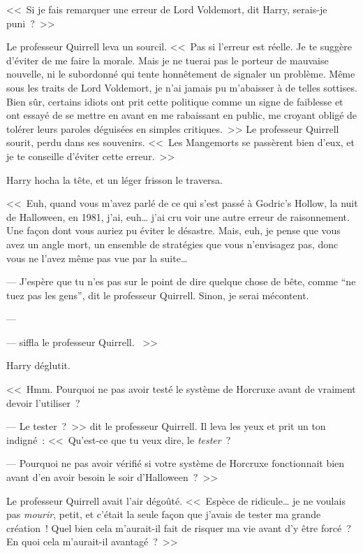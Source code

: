 <<~Si je fais remarquer une erreur de Lord Voldemort, dit Harry, serais-je puni~?~>>

Le professeur Quirrell leva un sourcil. <<~Pas si l'erreur est réelle. Je te suggère d'éviter de me faire la morale. Mais je ne tuerai pas le porteur de mauvaise nouvelle, ni le subordonné qui tente honnêtement de signaler un problème. Même sous les traits de Lord Voldemort, je n'ai jamais pu m'abaisser à de telles sottises. Bien sûr, certains idiots ont prit cette politique comme un signe de faiblesse et ont essayé de se mettre en avant en me rabaissant en public, me croyant obligé de tolérer leurs paroles déguisées en simples critiques.~>> Le professeur Quirrell sourit, perdu dans ses souvenirs. <<~Les Mangemorts se passèrent bien d'eux, et je te conseille d'éviter cette erreur.~>>

Harry hocha la tête, et un léger frisson le traversa.

<<~Euh, quand vous m'avez parlé de ce qui s'est passé à Godric's Hollow, la nuit de Halloween, en 1981, j'ai, euh… j'ai cru voir une autre erreur de raisonnement. Une façon dont vous auriez pu éviter le désastre. Mais, euh, je pense que vous avez un angle mort, un ensemble de stratégies que vous n'envisagez pas, donc vous ne l'avez même pas vue par la suite…

--- J'espère que tu n'es pas sur le point de dire quelque chose de bête, comme “ne tuez pas les gens”, dit le professeur Quirrell. Sinon, je serai mécontent.

--- 

---  siffla le professeur Quirrell. ~>>

Harry déglutit.

<<~Hmm. Pourquoi ne pas avoir testé le système de Horcruxe avant de vraiment devoir l'utiliser~?

--- Le tester~?~>> dit le professeur Quirrell. Il leva les yeux et prit un ton indigné~: <<~Qu'est-ce que tu veux dire, le \emph{tester}~?

--- Pourquoi ne pas avoir vérifié si votre système de Horcruxe fonctionnait bien avant d'en avoir besoin le soir d'Halloween~?~>>

Le professeur Quirrell avait l'air dégoûté. <<~Espèce de ridicule… je ne voulais pas \emph{mourir}, petit, et c'était la seule façon que j'avais de tester ma grande création~! Quel bien cela m'aurait-il fait de risquer ma vie avant d'y être forcé~? En quoi cela m'aurait-il avantagé~?~>>

